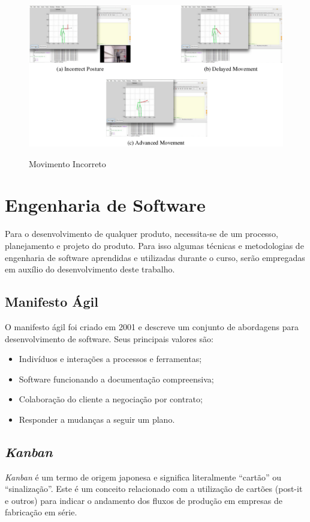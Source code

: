 \begin{figure}[H]
\centering
\includegraphics [keepaspectratio=true,scale=0.60]{figuras/movimentoIncorreto.eps}

\caption{Movimento Incorreto}
\cite{roberto}
\label{movimentoIncorreto}
\end{figure}

\section{Engenharia de Software}\label{sec:engenhariaSoft}
  Para o desenvolvimento de qualquer produto, necessita-se de um processo,
planejamento e projeto do produto. Para isso algumas técnicas e metodologias de
engenharia de software  aprendidas e utilizadas durante o curso, serão empregadas em
auxílio do desenvolvimento deste trabalho.
\subsection{Manifesto Ágil}
\label{sec:Manifesto Ágil}
  O manifesto ágil foi criado em 2001 e descreve um conjunto de abordagens para
desenvolvimento de software.
  Seus principais valores são:
  \begin{itemize}
  \item Indivíduos e interações a processos e ferramentas;
  \item Software funcionando a documentação compreensiva;
  \item Colaboração do cliente a negociação por contrato;
  \item Responder a mudanças a seguir um plano.\cite{manifestoAgil}
  \end{itemize}


\subsection{\textit{Kanban}}
\label{sec:kanban}
\textit{Kanban} é um termo de origem japonesa e significa literalmente “cartão” ou “sinalização”.
Este é um conceito relacionado com a utilização de cartões (post-it e outros) para indicar o andamento dos fluxos de produção em empresas de fabricação em série.

